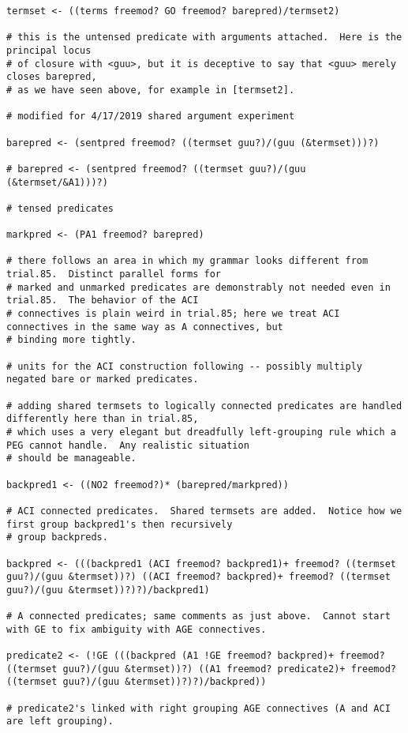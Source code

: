 \documentclass[12pt]{book}
\begin{document}
{\begin{verbatim}
termset <- ((terms freemod? GO freemod? barepred)/termset2)

# this is the untensed predicate with arguments attached.  Here is the principal locus
# of closure with <guu>, but it is deceptive to say that <guu> merely closes barepred,
# as we have seen above, for example in [termset2].

# modified for 4/17/2019 shared argument experiment

barepred <- (sentpred freemod? ((termset guu?)/(guu (&termset)))?)

# barepred <- (sentpred freemod? ((termset guu?)/(guu (&termset/&A1)))?)

# tensed predicates

markpred <- (PA1 freemod? barepred)

# there follows an area in which my grammar looks different from trial.85.  Distinct parallel forms for
# marked and unmarked predicates are demonstrably not needed even in trial.85.  The behavior of the ACI
# connectives is plain weird in trial.85; here we treat ACI connectives in the same way as A connectives, but
# binding more tightly.

# units for the ACI construction following -- possibly multiply negated bare or marked predicates.

# adding shared termsets to logically connected predicates are handled differently here than in trial.85,
# which uses a very elegant but dreadfully left-grouping rule which a PEG cannot handle.  Any realistic situation
# should be manageable.

backpred1 <- ((NO2 freemod?)* (barepred/markpred))

# ACI connected predicates.  Shared termsets are added.  Notice how we first group backpred1's then recursively
# group backpreds.

backpred <- (((backpred1 (ACI freemod? backpred1)+ freemod? ((termset guu?)/(guu &termset))?) ((ACI freemod? backpred)+ freemod? ((termset guu?)/(guu &termset))?)?)/backpred1)

# A connected predicates; same comments as just above.  Cannot start with GE to fix ambiguity with AGE connectives.

predicate2 <- (!GE (((backpred (A1 !GE freemod? backpred)+ freemod? ((termset guu?)/(guu &termset))?) ((A1 freemod? predicate2)+ freemod? ((termset guu?)/(guu &termset))?)?)/backpred))

# predicate2's linked with right grouping AGE connectives (A and ACI are left grouping).


\end{verbatim}}
\end{document}
